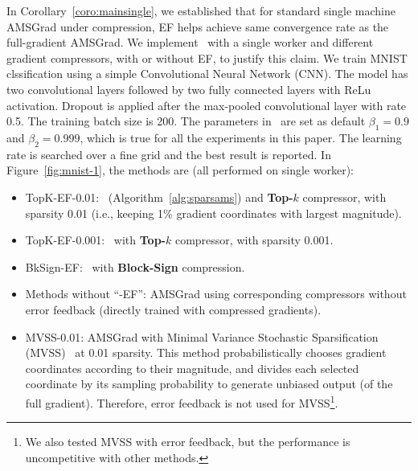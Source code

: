 \documentclass[11pt]{article}
\begin{document}
In Corollary~\ref{coro:mainsingle}, we established that for standard single machine AMSGrad under compression, EF helps achieve same convergence rate as the full-gradient AMSGrad. We implement \algo\ with a single worker and different gradient compressors, with or without EF, to justify this claim. We train MNIST clssification using a simple Convolutional Neural Network (CNN). The model has two convolutional layers followed by two fully connected layers with ReLu activation. Dropout is applied after the max-pooled convolutional layer with rate 0.5. The training batch size is 200. The parameters in \algo\ are set as default $\beta_1=0.9$ and $\beta_2=0.999$, which is true for all the experiments in this paper. The learning rate is searched over a fine grid and the best result is reported. In Figure~\ref{fig:mnist-1}, the methods are (all performed on single worker):
\begin{itemize}
    \item TopK-EF-0.01: \algo\ (Algorithm~\ref{alg:sparsams}) and \textbf{Top-$k$} compressor, with sparsity 0.01 (i.e., keeping 1\% gradient coordinates with largest magnitude).
    
    \item TopK-EF-0.001: \algo\ with \textbf{Top-$k$} compressor, with sparsity 0.001.
    
    \item BkSign-EF: \algo\ with \textbf{Block-Sign} compression.
    
    \item Methods without ``-EF'':  AMSGrad using corresponding compressors without error feedback (directly trained with compressed gradients).
    
    \item MVSS-0.01: AMSGrad with Minimal Variance Stochastic Sparsification (MVSS)~\cite{wangni2018gradient} at 0.01 sparsity. This method probabilistically chooses gradient coordinates according to their magnitude, and divides each selected coordinate by its sampling probability to generate unbiased output (of the full gradient). Therefore, error feedback is not used for MVSS\footnote{We also tested MVSS with error feedback, but the performance is uncompetitive with other methods.}.
\end{itemize}
\end{document}
